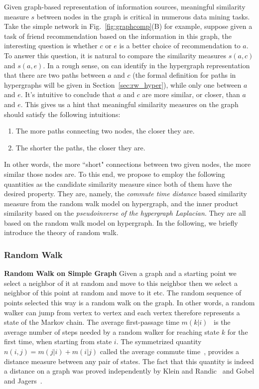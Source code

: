 Given graph-based representation of information sources, meaningful similarity measure $s$ between nodes in the graph is critical in numerous data mining tasks. Take the simple network in Fig.~\ref{fig:graphcomp}(B) for example, suppose given a task of friend recommendation based on the information in this graph, the interesting question is whether $c$ or $e$ is a better choice of recommendation to $a$. To answer this question, it is natural to compare the similarity measures $s(a, c)$ and $s(a, e)$. In a rough sense, on can identify in the hypergraph representation that there are two paths between $a$ and $c$ (the formal definition for paths in hypergraphs will be given in Section~\ref{sec:rw_hyper}), while only one between $a$ and $e$. It's intuitive to conclude that $a$ and $c$ are more similar, or closer, than $a$ and $e$. This gives us a hint that meaningful similarity measures on the graph should satisfy the following intuitions:
\begin{enumerate}
\item The more paths connecting two nodes, the closer they are.
\item The shorter the paths, the closer they are.
\end{enumerate}
In other words, the more ``short" connections between two given nodes, the more similar those nodes are. To this end, we propose to employ the following quantities as the candidate similarity measure since both of them have the desired property. They are, namely, the \emph{commute time distance} based similarity measure from the random walk model on hypergraph, and the inner product similarity based on the \emph{pseudoinverse of the hypergraph Laplacian}. They are all based on the random walk model on hypergraph. In the following, we briefly introduce the theory of random walk.

\subsubsection{Random Walk}
\textbf{Random Walk on Simple Graph}
Given a graph and a starting point we select a neighbor of it at random and move to this neighbor then we select a neighbor of this point at random and move to it etc. The random sequence of points selected this way is a random walk on the graph. In other words, a random walker can jump from vertex to vertex and each vertex therefore represents a state of the Markov chain. The average first-passage time $m(k|i)$~\cite{randomwalks} is the average number of steps needed by a random walker for reaching state $k$ for the first time, when starting from state $i$. The symmetrized quantity $n(i,j)=m(j|i)+m(i|j)$ called the average commute time~\cite{randomwalks}, provides a distance measure between any pair of states. The fact that this quantity is indeed a distance on a graph was proved independently by Klein and Randic~\cite{Klein} and Gobel and Jagers~\cite{Gobel}.

